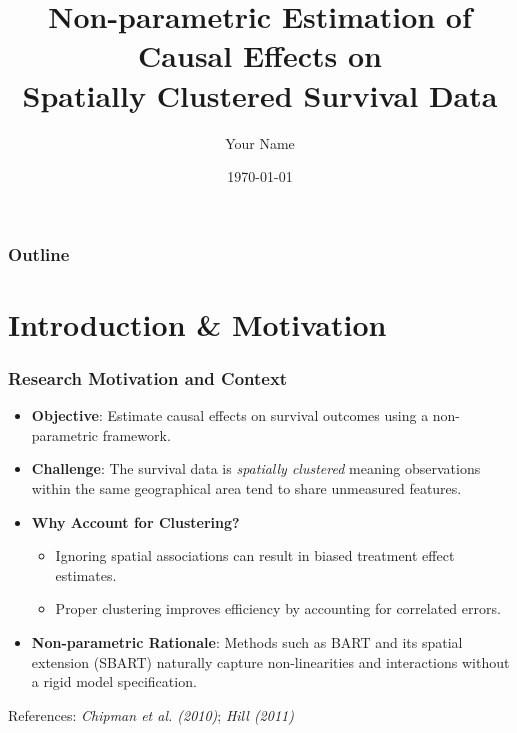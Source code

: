 \documentclass{beamer}
\title{Non-parametric Estimation of Causal Effects on \\ Spatially Clustered Survival Data}
\author{Your Name}
\date{\today}
\begin{document}
\begin{frame}
  \titlepage
\end{frame}

\begin{frame}
  \frametitle{Outline}
  \tableofcontents
\end{frame}

\section{Introduction \& Motivation}

\begin{frame}
\frametitle{Research Motivation and Context}
\begin{itemize}
    \item \textbf{Objective}: Estimate causal effects on survival outcomes using a non-parametric framework.
    \item \textbf{Challenge}: The survival data is \emph{spatially clustered} meaning observations within the same geographical area tend to share unmeasured features.
    \item \textbf{Why Account for Clustering?} 
    \begin{itemize}
      \item Ignoring spatial associations can result in biased treatment effect estimates.
      \item Proper clustering improves efficiency by accounting for correlated errors.
    \end{itemize}
    \item \textbf{Non-parametric Rationale}: Methods such as BART and its spatial extension (SBART) naturally capture non-linearities and interactions without a rigid model specification.
\end{itemize}
\vspace{0.3cm}
\footnotesize References: \textit{Chipman et al. (2010)}; \textit{Hill (2011)}
\end{frame}
\end{document}
